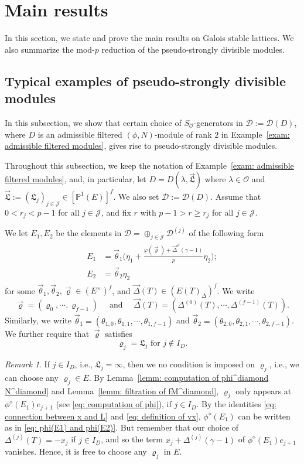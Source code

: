 \documentclass[11pt]{amsart}
\theoremstyle{definition}
\numberwithin{equation}{subsection}
\theoremstyle{plain}
\theoremstyle{plain}
\theoremstyle{plain}
\theoremstyle{plain}
\theoremstyle{plain}
\theoremstyle{plain}
\theoremstyle{plain}
\theoremstyle{plain}
\theoremstyle{plain}
\theoremstyle{plain}
\theoremstyle{plain}
\theoremstyle{plain}
\theoremstyle{definition}
\theoremstyle{definition}
\theoremstyle{definition}
\theoremstyle{remark}
\newtheorem{rema}[equation]{Remark}
\renewcommand{\(}{\textup{(}}
\renewcommand{\)}{\textup{)}}
\newcommand{\fL}{\mathfrak{L}}
\newcommand{\cD}{\mathcal{D}}
\newcommand{\cO}{\mathcal{O}}
\newcommand{\cJ}{\mathcal{J}}
\newcommand{\vL}{\vec{\fL}}
\newcommand{\vth}{\vec{\theta}}
\newcommand{\vrho}{\vec{\varrho}}
\newcommand{\vDel}{\vec{\Delta}}
\begin{document}
\smallskip
\section{Main results}\label{sec: main results}
In this section, we state and prove the main results on Galois stable lattices. We also summarize the mod-$p$ reduction of the pseudo-strongly divisible modules.

\subsection{Typical examples of pseudo-strongly divisible modules}\label{subsec: set up}
In this subsection, we show that certain choice of $S_\cO$-generators in $\cD:=\cD(D)$, where $D$ is an admissible filtered $(\phi,N)$-module of rank $2$ in Example~\ref{exam: admissible filtered modules}, gives rise to pseudo-strongly divisible modules.


Throughout this subsection, we keep the notation of Example~\ref{exam: admissible filtered modules}, and, in particular, let $D=D(\lambda,\vL)$ where $\lambda\in\cO$ and $\vL:=(\fL_j)_{j\in\cJ}\in[\mathbb{P}^1(E)]^f$. We also set $\cD:=\cD(D)$. Assume that $0<r_j<p-1$ for all $j\in\cJ$, and fix $r$ with $p-1 > r\geq r_j$ for all $j\in\cJ$.

We let $E_1,E_2$ be the elements in $\cD=\oplus_{j\in\cJ}\cD^{(j)}$ of the following form
\begin{align}\label{eq: form of generators of sdm}
\begin{split}
    E_1&=\vth_1\bigg(\eta_1+\frac{\varphi(\vrho)+\vDel^\varphi(\gamma-1)}{p}\eta_2\bigg);\\
    E_2&=\vth_2\eta_2
\end{split}
\end{align}
for some $\vth_1,\vth_2,\vrho \in (E^\times)^f$, and $\vDel(T)\in (E(T)_\Delta)^f$. We write
$$\vrho=(\varrho_0,\cdots,\varrho_{f-1})\quad\mbox{ and }\quad\vDel(T)=(\Delta^{(0)}(T),\cdots,\Delta^{(f-1)}(T)).$$ 
Similarly, we write $\vth_1=(\theta_{1,0},\theta_{1,1},\cdots,\theta_{1,f-1})$ and $\vth_2=(\theta_{2,0},\theta_{2,1},\cdots,\theta_{2,f-1})$. 
We further require that $\vrho$ satisfies
\begin{equation}\label{eq: definition of varrho}
    \varrho_{j}=\fL_j \mbox{ for } j\not\in I_D.
\end{equation}

\begin{rema}\label{rema: why fL_j=varho_j}
If $j\in I_D$, i.e., $\fL_j=\infty$, then we no condition is imposed on $\varrho_j$, i.e., we can choose any $\varrho_j\in E$. By Lemma~\ref{lemm: computation of phi^diamond N^diamond} and Lemma~\ref{lemm: filtration of fM^diamond}, $\varrho_j$ only appears at $\phi^{\diamond}(E_1)e_{j+1}$ (see \eqref{eq: computation of phi}), if $j\in I_D$. By the identities \eqref{eq: connection between x and L} and \eqref{eq: definition of vx}, $\phi^{\diamond}(E_1)$ can be written as in \eqref{eq: phi(E1) and phi(E2)}. But remember that our choice of $\Delta^{(j)}(T)=-x_j$ if $j\in I_D$, and so the term $x_j+\Delta^{(j)}(\gamma-1)$ of $\phi^{\diamond}(E_1)e_{j+1}$ vanishes. Hence, it is free to choose any $\varrho_j$ in $E$.
\end{rema}
\end{document}
